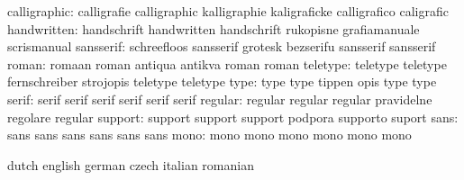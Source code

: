              calligraphic: calligrafie               calligraphic
                           kalligraphie              kaligraficke
                           calligrafico              caligrafic
              handwritten: handschrift               handwritten
                           handschrift               rukopisne
                           grafiamanuale             scrismanual
                sansserif: schreefloos               sansserif
                           grotesk                   bezserifu
                           sansserif                 sansserif %
                    roman: romaan                    roman
                           antiqua                   antikva
                           roman                     roman %
                 teletype: teletype                  teletype
                           fernschreiber             strojopis
                           teletype                  teletype %
                     type: type                      type
                           tippen                    opis
                           type                      type %
                    serif: serif                     serif
                           serif                     serif
                           serif                     serif %
                  regular: regular                   regular
                           regular                   pravidelne
                           regolare                  regular
                  support: support                   support
                           support                   podpora
                           supporto                  suport
                     sans: sans                      sans
                           sans                      sans
                           sans                      sans
                     mono: mono                      mono
                           mono                      mono
                           mono                      mono

\stopvariables




\startsetupvariables       dutch                     english
                           german                    czech
                           italian                   romanian

